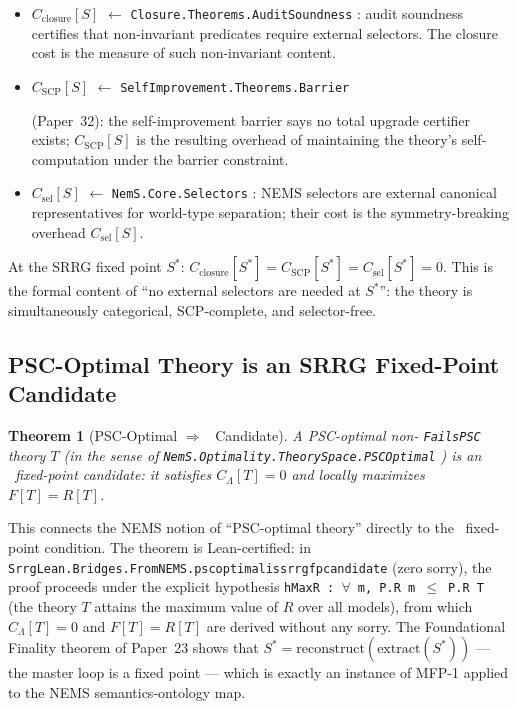 \documentclass[11pt]{article}
\newtheorem{theorem}{Theorem}[section]
\theoremstyle{remark}
\newcommand{\SRRG}{\text{SRRG}}
\newcommand{\lean}[1]{%
  \penalty-100
  \begingroup
  \def\_{\textunderscore\allowbreak}%
  \texttt{#1}%
  \endgroup
}
\newcommand{\Sstar}{S^*}
\begin{document}
\begin{itemize}[leftmargin=2.5em]
\item $C_{\text{closure}}[S]$ $\leftarrow$ \lean{Closure.Theorems.AuditSoundness}:
  audit soundness certifies that non-invariant predicates require external selectors.
  The closure cost is the measure of such non-invariant content.

\item $C_{\text{SCP}}[S]$ $\leftarrow$ \lean{SelfImprovement.Theorems.Barrier}
  (Paper~32): the self-improvement barrier says no total upgrade certifier exists;
  $C_{\text{SCP}}[S]$ is the resulting overhead of maintaining the theory's
  self-computation under the barrier constraint.

\item $C_{\text{sel}}[S]$ $\leftarrow$ \lean{NemS.Core.Selectors}: NEMS selectors
  are external canonical representatives for world-type separation; their cost
  is the symmetry-breaking overhead $C_{\text{sel}}[S]$.
\end{itemize}

At the SRRG fixed point $\Sstar$:
$C_{\text{closure}}[\Sstar] = C_{\text{SCP}}[\Sstar] = C_{\text{sel}}[\Sstar] = 0$.
This is the formal content of ``no external selectors are needed at $\Sstar$'':
the theory is simultaneously categorical, SCP-complete, and selector-free.

\subsection{PSC-Optimal Theory is an SRRG Fixed-Point Candidate}
\label{sec:psc_fp}

\begin{theorem}[PSC-Optimal $\Rightarrow$ \SRRG\ Candidate]
\label{thm:psc_fp_candidate}
A PSC-optimal non-\lean{FailsPSC} theory $T$ (in the sense of
\lean{NemS.Optimality.TheorySpace.PSCOptimal}) is an \SRRG\ fixed-point
candidate: it satisfies $C_\Lambda[T] = 0$ and locally maximizes $F[T] = R[T]$.
\end{theorem}

This connects the NEMS notion of ``PSC-optimal theory'' directly to the \SRRG\
fixed-point condition.  The theorem is Lean-certified: in
\lean{SrrgLean.Bridges.FromNEMS.psc\_optimal\_is\_srrg\_fp\_candidate} (zero sorry),
the proof proceeds under the explicit hypothesis
\lean{hMaxR : $\forall$ m, P.R m $\leq$ P.R T} (the theory $T$ attains the maximum value of
$R$ over all models), from which $C_\Lambda[T] = 0$ and
$F[T] = R[T]$ are derived without any sorry.
The Foundational Finality theorem of Paper~23
\cite{SpivackNEMSHub} shows that
$\Sstar = \text{reconstruct}(\text{extract}(\Sstar))$ --- the master loop is a
fixed point --- which is exactly an instance of MFP-1 applied to the NEMS
semantics-ontology map.
\end{document}
